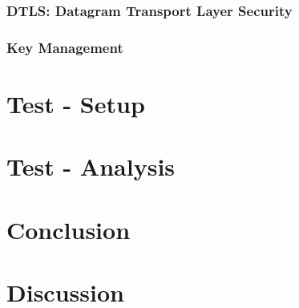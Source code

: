 \documentclass[11pt]{book}
\begin{document}
\subsection{DTLS: Datagram Transport Layer Security}
\subsection{Key Management}
\chapter{Test - Setup}
\chapter{Test - Analysis}
\chapter{Conclusion}
\chapter{Discussion}
\end{document}

